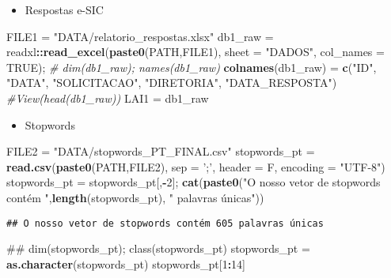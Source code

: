 \documentclass[]{article}
\newenvironment{Shaded}{\begin{snugshade}}{\end{snugshade}}
\newcommand{\KeywordTok}[1]{\textcolor[rgb]{0.13,0.29,0.53}{\textbf{#1}}}
\newcommand{\DataTypeTok}[1]{\textcolor[rgb]{0.13,0.29,0.53}{#1}}
\newcommand{\DecValTok}[1]{\textcolor[rgb]{0.00,0.00,0.81}{#1}}
\newcommand{\StringTok}[1]{\textcolor[rgb]{0.31,0.60,0.02}{#1}}
\newcommand{\CommentTok}[1]{\textcolor[rgb]{0.56,0.35,0.01}{\textit{#1}}}
\newcommand{\OtherTok}[1]{\textcolor[rgb]{0.56,0.35,0.01}{#1}}
\newcommand{\OperatorTok}[1]{\textcolor[rgb]{0.81,0.36,0.00}{\textbf{#1}}}
\newcommand{\NormalTok}[1]{#1}
\providecommand{\tightlist}{%
  \setlength{\itemsep}{0pt}\setlength{\parskip}{0pt}}
\begin{document}
\begin{itemize}
\tightlist
\item
  Respostas e-SIC
\end{itemize}

\begin{Shaded}
\begin{Highlighting}[]
\NormalTok{FILE1 =}\StringTok{ "DATA/relatorio_respostas.xlsx"}
\NormalTok{db1_raw =}\StringTok{ }\NormalTok{readxl}\OperatorTok{::}\KeywordTok{read_excel}\NormalTok{(}\KeywordTok{paste0}\NormalTok{(PATH,FILE1), }\DataTypeTok{sheet =} \StringTok{"DADOS"}\NormalTok{, }\DataTypeTok{col_names =} \OtherTok{TRUE}\NormalTok{); }
\CommentTok{# dim(db1_raw); names(db1_raw)}
\KeywordTok{colnames}\NormalTok{(db1_raw) =}\StringTok{ }\KeywordTok{c}\NormalTok{(}\StringTok{"ID"}\NormalTok{, }\StringTok{"DATA"}\NormalTok{, }\StringTok{"SOLICITACAO"}\NormalTok{, }\StringTok{"DIRETORIA"}\NormalTok{, }\StringTok{"DATA_RESPOSTA"}\NormalTok{)}
\CommentTok{#View(head(db1_raw))}
\NormalTok{LAI1 =}\StringTok{ }\NormalTok{db1_raw}
\end{Highlighting}
\end{Shaded}

\begin{itemize}
\tightlist
\item
  Stopwords
\end{itemize}

\begin{Shaded}
\begin{Highlighting}[]
\NormalTok{FILE2 =}\StringTok{ "DATA/stopwords_PT_FINAL.csv"}
\NormalTok{stopwords_pt =}\StringTok{ }\KeywordTok{read.csv}\NormalTok{(}\KeywordTok{paste0}\NormalTok{(PATH,FILE2), }\DataTypeTok{sep =} \StringTok{';'}\NormalTok{, }\DataTypeTok{header =}\NormalTok{ F, }\DataTypeTok{encoding =} \StringTok{"UTF-8"}\NormalTok{)}
\NormalTok{stopwords_pt =}\StringTok{ }\NormalTok{stopwords_pt[,}\OperatorTok{-}\DecValTok{2}\NormalTok{]; }
\KeywordTok{cat}\NormalTok{(}\KeywordTok{paste0}\NormalTok{(}\StringTok{"O nosso vetor de stopwords contém "}\NormalTok{,}\KeywordTok{length}\NormalTok{(stopwords_pt), }\StringTok{" palavras únicas"}\NormalTok{))}
\end{Highlighting}
\end{Shaded}

\begin{verbatim}
## O nosso vetor de stopwords contém 605 palavras únicas
\end{verbatim}

\begin{Shaded}
\begin{Highlighting}[]
\NormalTok{## dim(stopwords_pt); class(stopwords_pt)}
\NormalTok{stopwords_pt =}\StringTok{ }\KeywordTok{as.character}\NormalTok{(stopwords_pt)}
\NormalTok{stopwords_pt[}\DecValTok{1}\OperatorTok{:}\DecValTok{14}\NormalTok{]}
\end{Highlighting}
\end{Shaded}
\end{document}
